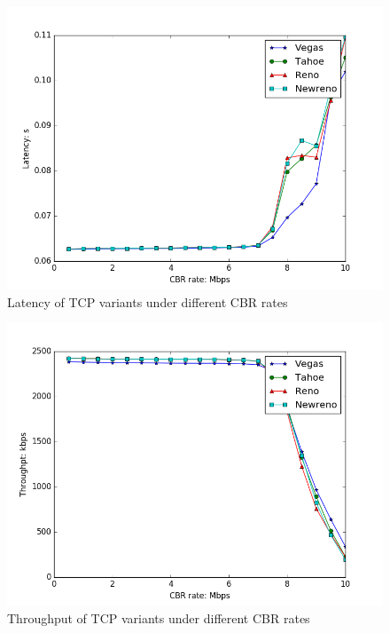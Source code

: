 \documentclass[10pt, conference]{IEEEtran/IEEEtran}
\begin{document}
\begin{figure}[!ht]
\begin{center}
\includegraphics[width=\linewidth]{../exp1/exp1_lat.png}
\caption{Latency of TCP variants under different CBR rates}
\label{exp1_lat}
\end{center}
\end{figure}

\begin{figure}[!ht]
\begin{center}
\includegraphics[width=\linewidth]{../exp1/exp1_thpt.png}
\caption{Throughput of TCP variants under different CBR rates}
\label{exp1_thpt}
\end{center}
\end{figure}
\end{document}
